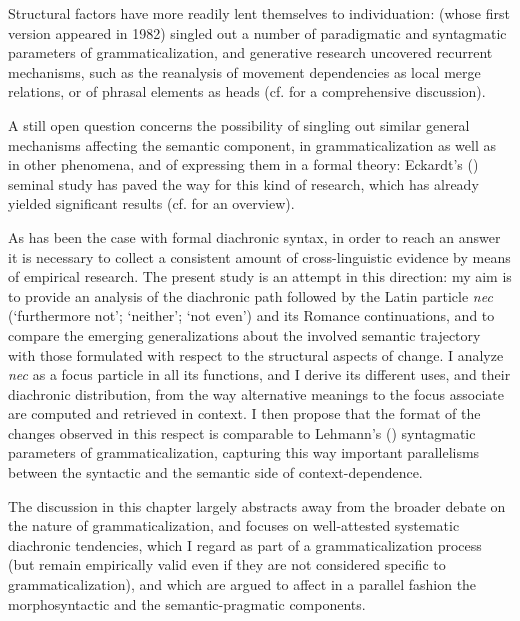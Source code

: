 \documentclass[output=paper,modfonts,nonflat,citecolor=brown,
showindex
]{langsci/langscibook}
\begin{document}
Structural factors have more readily lent themselves to individuation: \citet[]{Lehmann15} (whose first version appeared in 1982) singled out a number of paradigmatic and syntagmatic parameters of grammaticalization, and generative research uncovered recurrent mechanisms, such as the reanalysis of movement dependencies as local merge relations, or of phrasal elements as heads (cf. \citealt[]{RobertsRoussou03, Gelderen04a} for a comprehensive discussion). 

A still open question concerns the possibility of singling out similar general mechanisms affecting the semantic component, in grammaticalization as well as in other phenomena, and of expressing them in a formal theory: Eckardt's (\citeyear{Eckardt06}) seminal study has paved the way for this kind of research, which has already yielded significant results (cf. \citealt[]{Eckardt12, Deo15, Gianolloetal15} for an overview). 

As has been the case with formal diachronic syntax, in order to reach an answer it is necessary to collect a consistent amount of cross-linguistic evidence by means of empirical research. The present study is an attempt in this direction: my aim is to provide an analysis of the diachronic path followed by the Latin particle {\emph{nec}} (`furthermore not'; `neither'; `not even') and its Romance continuations, and to compare the emerging generalizations about the involved semantic trajectory with those formulated with respect to the structural aspects of change. I analyze {\emph{nec}} as a focus particle in all its functions, and I derive its different uses, and their diachronic distribution, from the way alternative meanings to the focus associate are computed and retrieved in context. I then propose that the format of the changes observed in this respect is comparable to Lehmann's (\citeyear[]{Lehmann15}) syntagmatic parameters of grammaticalization, capturing this way important parallelisms between the syntactic and the semantic side of context-dependence.  

The discussion in this chapter largely abstracts away from the broader debate on the nature of grammaticalization, and focuses on well-attested systematic diachronic tendencies, which I regard as part of a grammaticalization process (but remain empirically valid even if they are not considered specific to grammaticalization), and which are argued to affect in a parallel fashion the morphosyntactic and the semantic-pragmatic components.
\end{document}
